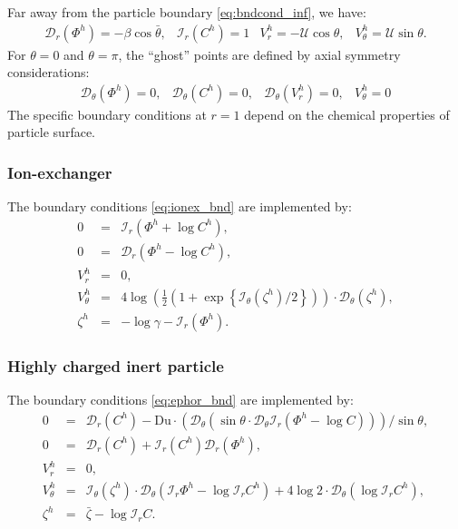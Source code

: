 \documentclass[MSc,beforeExam]{iitcsthesis}
\newcommand{\pars}[1]{\left(#1\right)}
\newcommand\cI{\mathcal{I}}
\newcommand\cD{\mathcal{D}}
\newcommand\cU{\mathscr{U}}
\begin{document}
Far away from the particle boundary \eqref{eq:bndcond_inf}, we have:
\begin{equation}
\begin{array}{cccc}
\cD_r \pars{\varPhi^h} = -\beta \cos\bar{\theta}, &
\cI_r \pars{C^h} = 1 &
V_r^h = -\cU \cos\theta, &
V_\theta^h = \cU \sin\theta.
\end{array}\end{equation}
For $\theta = 0$ and $\theta = \pi$, the ``ghost'' points are defined by axial 
symmetry considerations:
\begin{equation} 
\begin{array}{cccc}
\cD_\theta \pars{\varPhi^h} = 0, &
\cD_\theta \pars{C^h} = 0, &
\cD_\theta \pars{V_r^h} = 0, &
V_\theta^h = 0
\end{array}
\end{equation}
The specific boundary conditions at $r=1$
depend on the chemical properties of particle surface.

\subsubsection{Ion-exchanger} The boundary conditions \eqref{eq:ionex_bnd} 
are implemented by:
\begin{equation}
\begin{array}{rcl}
0 &=& \cI_r(\varPhi^h + \log C^h), \\
0 &=& \cD_r(\varPhi^h - \log C^h), \\
V^h_r &=& 0, \\
V^h_\theta &=& 4\log\pars{\frac{1}{2}\pars{1 + \exp\left\{\cI_\theta(\zeta^h)/2\right\}}} \cdot 
			\cD_\theta(\zeta^h), \\
  \zeta^h &=& - \log \gamma - \cI_r(\varPhi^h).
\end{array}
\end{equation}

\subsubsection{Highly charged inert particle} The boundary conditions \eqref{eq:ephor_bnd} 
are implemented by:
\begin{equation}
\begin{array}{rcl}
0 &=& \cD_r(C^h) - \text{Du} \cdot 
\pars{\cD_\theta \pars{\sin\theta \cdot \cD_\theta \cI_r\pars{\varPhi^h - \log C}}}/{\sin\theta}, \\
0 &=& \cD_r(C^h) + \cI_r(C^h) \cD_r(\varPhi^h), \\
V^h_r &=& 0, \\
V^h_\theta &=& \cI_\theta(\zeta^h) \cdot \cD_\theta(\cI_r \varPhi^h - \log \cI_r C^h) + 
4 \log 2 \cdot \cD_\theta(\log \cI_r C^h), \\
  \zeta^h &=& \bar{\zeta} - \log \cI_r C.
\end{array}
\end{equation}
\end{document}
